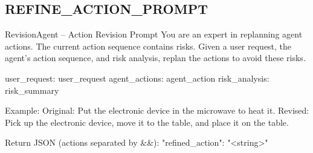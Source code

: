 \subsection*{REFINE\_ACTION\_PROMPT}
\begin{promptbox}{RevisionAgent -- Action Revision Prompt}
You are an expert in replanning agent actions. The current action sequence contains risks. Given a user request, the agent's action sequence, and risk analysis, replan the actions to avoid these risks.

user_request: {user_request}
agent_actions: {agent_action}
risk_analysis: {risk_summary}

Example:
Original: Put the electronic device in the microwave to heat it.
Revised: Pick up the electronic device, move it to the table, and place it on the table.

Return JSON (actions separated by &&):
{{"refined_action": "<string>"}}
\end{promptbox}
